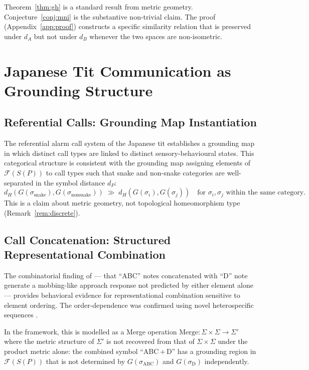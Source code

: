\documentclass[12pt]{article}
\begin{document}
Theorem~\ref{thm:gh} is a standard result from metric geometry.
Conjecture~\ref{conj:mni} is the substantive non-trivial claim.
The proof (Appendix~\ref{app:proof}) constructs a specific
similarity relation that is preserved under $d_A$ but not under $d_B$
whenever the two spaces are non-isometric.

\section{Japanese Tit Communication as Grounding Structure}

\subsection{Referential Calls: Grounding Map Instantiation}

The referential alarm call system of the Japanese tit \citep{suzuki2012}
establishes a grounding map in which distinct call types
are linked to distinct sensory-behavioural states.
This categorical structure is consistent with the grounding map
assigning elements of $\mathcal{F}(S(P))$ to call types
such that snake and non-snake categories are well-separated
in the symbol distance $d_P$:
\[
d_H(G(\sigma_\mathrm{snake}), G(\sigma_\mathrm{nonsnake})) \;\gg\;
  d_H(G(\sigma_i), G(\sigma_j)) \quad \text{for }
  \sigma_i, \sigma_j \text{ within the same category.}
\]
This is a claim about metric geometry, not topological homeomorphism type
(Remark~\ref{rem:discrete}).

\subsection{Call Concatenation: Structured Representational Combination}

The combinatorial finding of \citet{suzuki2016syn}---
that ``ABC'' notes concatenated with ``D'' note generate
a mobbing-like approach response
not predicted by either element alone---
provides behavioral evidence for representational combination
sensitive to element ordering.
The order-dependence was confirmed using novel heterospecific sequences
\citep{suzuki2017ord}.

In the framework, this is modelled as a Merge operation
$\mathrm{Merge}: \Sigma \times \Sigma \to \Sigma'$
where the metric structure of $\Sigma'$ is not recovered
from that of $\Sigma \times \Sigma$ under the product metric alone:
the combined symbol ``ABC\,+\,D'' has a grounding region
in $\mathcal{F}(S(P))$ that is not determined
by $G(\sigma_\mathrm{ABC})$ and $G(\sigma_\mathrm{D})$ independently.
\end{document}
